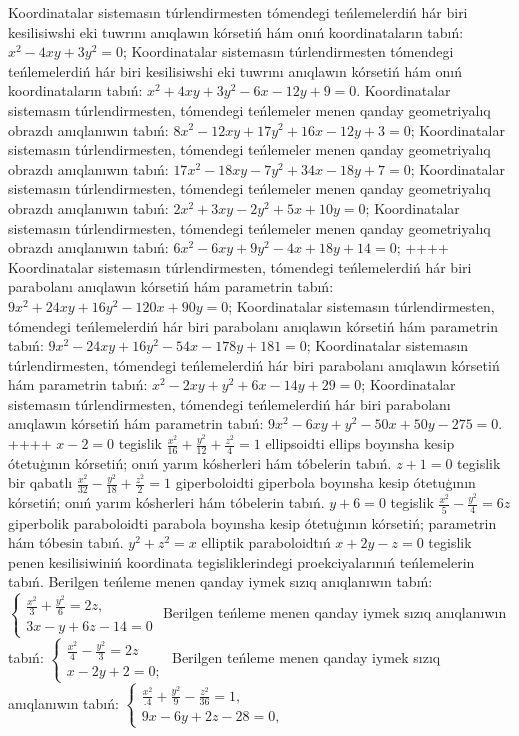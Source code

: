 Koordinatalar sistemasın túrlendirmesten tómendegi teńlemelerdiń hár biri kesilisiwshi eki tuwrını anıqlawın kórsetiń hám onıń koordinataların tabıń: $x^2-4 x y+3 y^2=0$;
Koordinatalar sistemasın túrlendirmesten tómendegi teńlemelerdiń hár biri kesilisiwshi eki tuwrını anıqlawın kórsetiń hám onıń koordinataların tabıń: $x^2+4 x y+3 y^2-6 x-12 y+9=0$.
Koordinatalar sistemasın túrlendirmesten, tómendegi teńlemeler menen qanday geometriyalıq obrazdı anıqlanıwın tabıń: $8 x^2-12 x y+17 y^2+16 x-12 y+3=0$;
Koordinatalar sistemasın túrlendirmesten, tómendegi teńlemeler menen qanday geometriyalıq obrazdı anıqlanıwın tabıń: $17 x^2-18 x y-7 y^2+34 x-18 y+7=0$;
Koordinatalar sistemasın túrlendirmesten, tómendegi teńlemeler menen qanday geometriyalıq obrazdı anıqlanıwın tabıń: $2 x^2+3 x y-2 y^2+5 x+10 y=0$;
Koordinatalar sistemasın túrlendirmesten, tómendegi teńlemeler menen qanday geometriyalıq obrazdı anıqlanıwın tabıń: $6 x^2-6 x y+9 y^2-4 x+18 y+14=0$;
++++
Koordinatalar sistemasın túrlendirmesten, tómendegi teńlemelerdiń hár biri parabolanı anıqlawın kórsetiń hám parametrin tabıń: $9 x^2+24 x y+16 y^2-120 x+90 y=0$;
Koordinatalar sistemasın túrlendirmesten, tómendegi teńlemelerdiń hár biri parabolanı anıqlawın kórsetiń hám parametrin tabıń: $9 x^2-24 x y+16 y^2-54 x-178 y+181=0$;
Koordinatalar sistemasın túrlendirmesten, tómendegi teńlemelerdiń hár biri parabolanı anıqlawın kórsetiń hám parametrin tabıń: $x^2-2 x y+y^2+6 x-14 y+29=0$;
Koordinatalar sistemasın túrlendirmesten, tómendegi teńlemelerdiń hár biri parabolanı anıqlawın kórsetiń hám parametrin tabıń: $9 x^2-6 x y+y^2-50 x+50 y-275=0$.
++++
$x-2=0$ tegislik $\frac{x^2}{16}+\frac{y^2}{12}+\frac{z^2}{4}=1$ ellipsoidti ellips boyınsha kesip ótetuģının kórsetiń; onıń yarım kósherleri hám tóbelerin tabıń.
$z+1=0$ tegislik bir qabatlı $\frac{x^2}{32}-\frac{y^2}{18}+\frac{z^2}{2}=1$ giperboloidti giperbola boyınsha kesip ótetuģının kórsetiń; onıń yarım kósherleri hám tóbelerin tabıń.
$y+6=0$ tegislik $\frac{x^2}{5}-\frac{y^2}{4}=6 z$ giperbolik paraboloidti parabola boyınsha kesip ótetuģının kórsetiń; parametrin hám tóbesin tabıń.
$y^2+z^2=x$ elliptik paraboloidtıń $x+2 y-z=0$ tegislik penen kesilisiwiniń koordinata tegisliklerindegi proekciyalarınıń teńlemelerin tabıń.
Berilgen teńleme menen qanday iymek sızıq anıqlanıwın tabıń: $\left\{\begin{array}{l}\frac{x^2}{3}+\frac{y^2}{6}=2 z, \\ 3 x-y+6 z-14=0\end{array}\right.$
Berilgen teńleme menen qanday iymek sızıq anıqlanıwın tabıń: $\left\{\begin{array}{l}\frac{x^2}{4}-\frac{y^2}{3}=2 z \\ x-2 y+2=0 ;\end{array}\right.$
Berilgen teńleme menen qanday iymek sızıq anıqlanıwın tabıń: $\left\{\begin{array}{l}\frac{x^2}{.4}+\frac{y^2}{9}-\frac{z^2}{36}=1, \\ 9 x-6 y+2 z-28=0,\end{array}\right.$